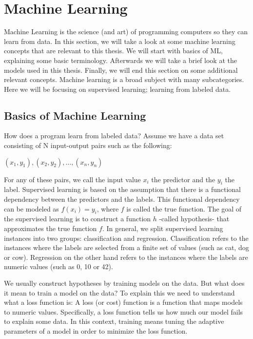 \section{Machine Learning}
Machine Learning is the science (and art) of programming computers so they can learn from data. \parencite{ml:homl}
In this section, we will take a look at some machine learning concepts that are relevant to this thesis.
We will start with basics of ML, explaining some basic terminology. 
Afterwards we will take a brief look at the models used in this thesis.
Finally, we will end this section on some additional relevant concepts.
Machine learning is a broad subject with many subcategories.
Here we will be focusing on supervised learning; learning from labeled data.

\subsection{Basics of Machine Learning}
How does a program learn from labeled data?
Assume we have a data set consisting of N input-output pairs such as the following:
 
$(x_1,y_1), (x_2,y_2), \ldots, (x_n,y_n)$

For any of these pairs, we call the input value $x_i$ the predictor and the $y_i$ the label.\parencite{ml:homl}
Supervised learning is based on the assumption that there is a functional dependency between the predictors and the labels.
This functional dependency can be modeled as $f(x_i)=y_i$, where $f$ is called the true function.
The goal of the supervised learning is to construct a function $h$ -called hypothesis- that approximates the true function $f$.
In general, we split supervised learning instances into two groups: classification and regression. 
Classification refers to the instances where the labels are selected from a finite set of values (such as cat, dog or cow).
Regression on the other hand refers to the instances where the labels are numeric values (such as 0, 10 or 42). \parencite{ai:ml}

We usually construct hypotheses by training models on the data.
But what does it mean to train a model on the data?
To explain this we need to understand what a loss function is:
A loss (or cost) function is a function that maps models to numeric values.
Specifically, a loss function tells us how much our model fails to explain some data.
In this context, training means tuning the adaptive parameters of a model in order to minimize the loss function. \parencite{ml:prml}

